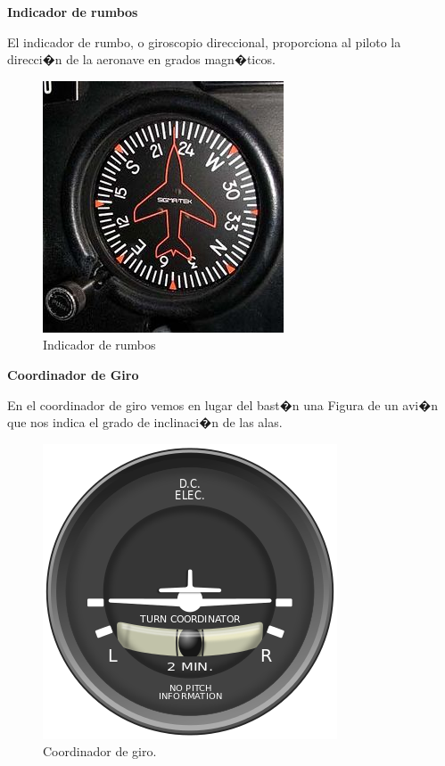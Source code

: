 \textbf{Indicador de rumbos }

\par El indicador de rumbo, o giroscopio direccional, proporciona al piloto la direcci�n de la aeronave en grados magn�ticos. 

\begin{figure}[h!]
	\centering
	\includegraphics[width=0.2\linewidth, height=0.2\linewidth]{Imagenes/indicador_rumbo}
	\caption{Indicador de rumbos}
	\label{fig:indicadorrumbo}
\end{figure}


\textbf{Coordinador de Giro}

\par En el coordinador de giro vemos en lugar del bast�n una Figura de un avi�n que nos indica el grado de inclinaci�n de las alas.


\begin{figure}[h!]
	\centering
	\includegraphics[width=0.3\linewidth, height=0.3\linewidth]{Imagenes/coord_de_giro}
	\caption{Coordinador de giro.}
	\label{fig:coord_de_giro}
\end{figure}

